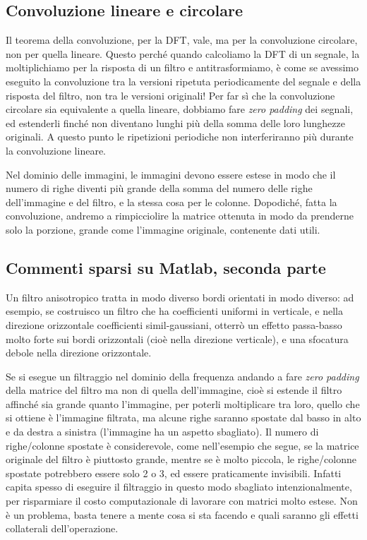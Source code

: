 \documentclass[a4paper,11pt]{article}
\begin{document}
\subsection{Convoluzione lineare e circolare}
Il teorema della convoluzione, per la DFT, vale, ma per la convoluzione circolare, non per quella lineare.
Questo perché quando calcoliamo la DFT di un segnale, la moltiplichiamo per la risposta di un filtro e antitrasformiamo, è come se avessimo
eseguito la convoluzione tra la versioni ripetuta periodicamente del segnale e della risposta del filtro, non tra le versioni originali!
Per far sì che la convoluzione circolare sia equivalente a quella lineare, dobbiamo fare \textit{zero padding} dei segnali, ed estenderli finché non
diventano lunghi più della somma delle loro lunghezze originali. A questo punto le ripetizioni periodiche non interferiranno più durante la convoluzione
lineare.
\par
Nel dominio delle immagini, le immagini devono essere estese in modo che il numero di righe diventi più grande della somma del numero delle righe
dell'immagine e del filtro, e la stessa cosa per le colonne. Dopodiché, fatta la convoluzione, andremo a rimpicciolire la matrice ottenuta in modo da prenderne
solo la porzione, grande come l'immagine originale, contenente dati utili.

\subsection{Commenti sparsi su Matlab, seconda parte}
Un filtro anisotropico tratta in modo diverso bordi orientati in modo diverso: ad esempio, se costruisco un filtro che ha coefficienti uniformi in verticale,
e nella direzione orizzontale coefficienti simil-gaussiani, otterrò un effetto passa-basso molto forte sui bordi orizzontali (cioè nella direzione verticale),
e una sfocatura debole nella direzione orizzontale.
\par
Se si esegue un filtraggio nel dominio della frequenza andando a fare \textit{zero padding} della matrice del filtro
ma non di quella dell'immagine, cioè si estende il filtro affinché sia grande quanto l'immagine, per poterli moltiplicare tra loro,
quello che si ottiene è l'immagine filtrata, ma alcune righe saranno spostate dal basso in alto e da destra a sinistra (l'immagine ha un aspetto
sbagliato). Il numero di righe/colonne spostate è considerevole, come nell'esempio che segue, se la matrice originale del filtro
è piuttosto grande, mentre se è molto piccola, le righe/colonne spostate potrebbero essere solo 2 o 3, ed essere praticamente
invisibili. Infatti capita spesso di eseguire il filtraggio in questo modo sbagliato intenzionalmente, per risparmiare il costo computazionale
di lavorare con matrici molto estese. Non è un problema, basta tenere a mente cosa si sta facendo e quali saranno gli effetti collaterali dell'operazione.
\end{document}
